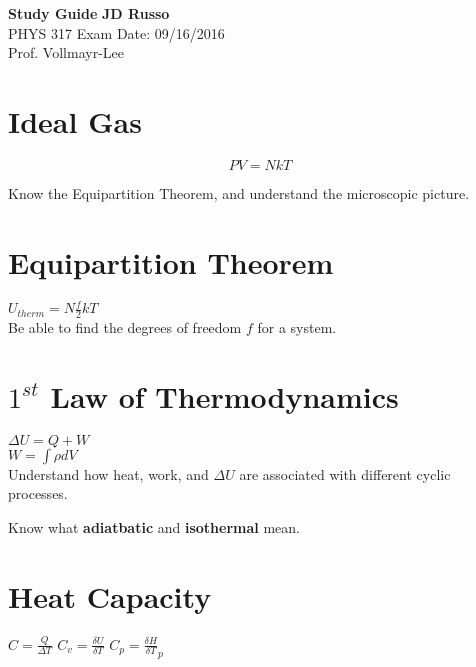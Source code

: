\documentclass[a4paper, 11pt]{article}
\begin{document}
\noindent
\setlength\parindent{0pt}

\large\textbf{Study Guide} \hfill \textbf{JD Russo} \\
\normalsize PHYS 317  \hfill Exam Date: 09/16/2016 \\%
Prof. Vollmayr-Lee

\newcommand{\notecard}[1]{\textbf{Notecard:} #1\\}

\section{Ideal Gas}

\begin{equation}
  PV = NkT
\end{equation}

Know the Equipartition Theorem, and understand the microscopic picture.

\section{Equipartition Theorem}

$U_{therm} = N \frac{f}{2}kT$\\

Be able to find the degrees of freedom $f$ for a system.

\section{$1^{st}$ Law of Thermodynamics}

$ \Delta U = Q+W$\\
$W=\int\rho dV$\\


Understand how heat, work, and $\Delta U$ are associated with different cyclic
processes.

Know what \textbf{adiatbatic} and \textbf{isothermal} mean.

\section{Heat Capacity}

$C = \frac{Q}{\Delta T}$
$C_v = \frac{\delta U}{\delta T}$
$C_p = \frac{\delta H}{\delta T}_p$\\
\end{document}
